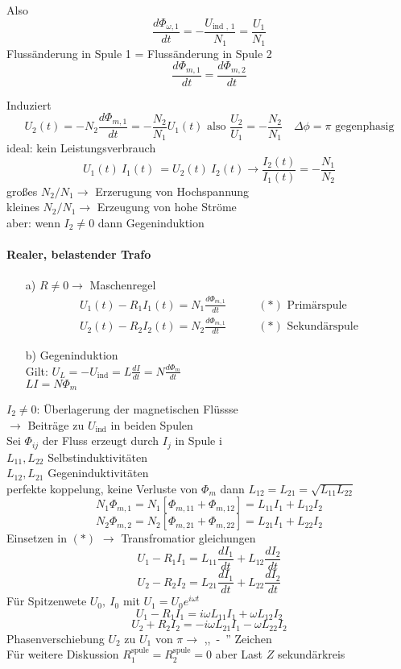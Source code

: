 \documentclass[titlepage,12pt,a4paper,ngerman]{report}
\newcommand{\tx}[1]{\textrm{#1}}
\newcommand{\uind}{U_{\tx{ind}}}
\begin{document}
Also $$ \frac{d\Phi_{\omega, 1}}{dt} = - \frac{U_{\tx{ind , 1}}}{N_1} = \frac{U_1}{N_1} $$
Flussänderung in Spule 1 = Flussänderung in Spule 2 
$$\frac{d\Phi_{m,1}}{dt} = \frac{d\Phi_{m,2}}{dt}$$

Induziert $$U_2(t) = - N_2 \frac{d\Phi_{m,1}}{dt} = - \frac{N_2}{N_1} U_1(t) \tx{ also } \frac{U_2}{U_1} = -\frac{N_2}{N_1}\quad \Delta\phi = \pi \tx{ gegenphasig}$$
ideal: kein Leistungsverbrauch
$$U_1(t)\ I_1(t)\ = U_2 (t)\ I_2(t) \rightarrow \frac{I_2 (t)}{I_1 (t) } = -\frac{N_1}{N_2}$$
großes $N_2/N_1 \rightarrow$ Erzerugung von Hochspannung\\
kleines $N_2/N_1 \rightarrow$ Erzeugung von hohe Ströme\\
aber: wenn $I_2 \neq 0$ dann Gegeninduktion
\paragraph{Realer, belastender Trafo}
\begin{enumerate}
	\item[a)] $R\neq 0 \rightarrow $ Maschenregel
	\begin{align*}
 	U_1 (t) - R_1I_1(t) = N_1 \frac{d\Phi_{m,1}}{dt} \qquad &(*) \tx{ Primärspule}\\
	U_2 (t) - R_2I_2(t) = N_2 \frac{d\Phi_{m,1}}{dt}  \qquad &(*) \tx{ Sekundärspule}
	\end{align*}
	\item[b)] Gegeninduktion\\
	Gilt: $U_L = - \uind = L\frac{dI}{dt}= N \frac{d\Phi_m}{dt}$\\
	$LI = N\Phi_m$
	\end{enumerate}
$ I_2 \neq 0 $: Überlagerung der magnetischen Flüssse\\
$ \rightarrow $ Beiträge zu $ \uind $ in beiden Spulen\\
Sei $ \Phi_{ij} $ der Fluss erzeugt durch $ I_j $ in Spule i \\
$ L_{11},L_{22} $ Selbstinduktivitäten\\
$ L_{12},L_{21} $ Gegeninduktivitäten \\
perfekte koppelung, keine Verluste von $\Phi_m$ dann $L_{12} = L_{21} = \sqrt{L_{11}L_{22}}$
$$N_1 \Phi_{m,1} = N_1[\Phi_{m,11} + \Phi_{m,12}] = L_{11} I_1 + L_{12}I_2$$
$$N_2 \Phi_{m,2} = N_2[\Phi_{m,21} + \Phi_{m,22}] = L_{21} I_1 + L_{22}I_2$$
Einsetzen in $(*)$ $\rightarrow$ Transfromatior gleichungen
$$U_1 - R_1 I_1 = L_{11} \frac{dI_1}{dt}+ L_{12} \frac{dI_2}{dt}$$
$$U_2 - R_2 I_2 = L_{21} \frac{dI_1}{dt}+ L_{22} \frac{dI_2}{dt}$$
Für Spitzenwete $U_0,\ I_0$ mit $U_1 = U_0 e^{i\omega t}$
$$U_1 - R_1 I_1 = i\omega L_{11} I_1 + \omega L_{12} I_2$$
$$U_2 + R_2 I_2 = - i\omega L_{21} I_1 - \omega L_{22} I_2$$
Phasenverschiebung $U_2$ zu $U_1$ von $\pi \rightarrow$ ,,\ -\ '' Zeichen\\
Für weitere Diskussion $R^{\tx{spule}}_1 = R^{\tx{spule}}_2 = 0$ aber Last $Z$ sekundärkreis
\end{document}
